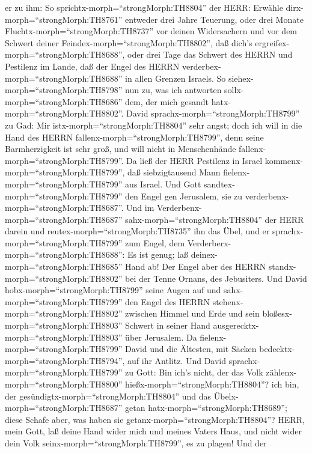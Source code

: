 er zu ihm: So sprichtx-morph=``strongMorph:TH8804'' der HERR: Erwähle
dirx-morph=``strongMorph:TH8761''  entweder drei Jahre
Teuerung, oder drei Monate Fluchtx-morph=``strongMorph:TH8737'' vor
deinen Widersachern und vor dem Schwert deiner
Feindex-morph=``strongMorph:TH8802'', daß dich's
ergreifex-morph=``strongMorph:TH8688'', oder drei Tage das Schwert des
HERRN und Pestilenz im Lande, daß der Engel des HERRN
verderbex-morph=``strongMorph:TH8688'' in allen Grenzen Israels. So
siehex-morph=``strongMorph:TH8798'' nun zu, was ich antworten
sollx-morph=``strongMorph:TH8686'' dem, der mich gesandt
hatx-morph=``strongMorph:TH8802''.  David
sprachx-morph=``strongMorph:TH8799'' zu Gad: Mir
istx-morph=``strongMorph:TH8804'' sehr angst; doch ich will in die Hand
des HERRN fallenx-morph=``strongMorph:TH8799'', denn seine
Barmherzigkeit ist sehr groß, und will nicht in Menschenhände
fallenx-morph=``strongMorph:TH8799''.  Da ließ der HERR
Pestilenz in Israel kommenx-morph=``strongMorph:TH8799'', daß
siebzigtausend Mann fielenx-morph=``strongMorph:TH8799'' aus Israel.
 Und Gott sandtex-morph=``strongMorph:TH8799'' den Engel
gen Jerusalem, sie zu verderbenx-morph=``strongMorph:TH8687''. Und im
Verderbenx-morph=``strongMorph:TH8687''
sahx-morph=``strongMorph:TH8804'' der HERR darein und
reutex-morph=``strongMorph:TH8735'' ihn das Übel, und er
sprachx-morph=``strongMorph:TH8799'' zum Engel, dem
Verderberx-morph=``strongMorph:TH8688'': Es ist genug; laß
deinex-morph=``strongMorph:TH8685'' Hand ab! Der Engel aber des HERRN
standx-morph=``strongMorph:TH8802'' bei der Tenne Ornans, des
Jebusiters.  Und David hobx-morph=``strongMorph:TH8799''
seine Augen auf und sahx-morph=``strongMorph:TH8799'' den Engel des
HERRN stehenx-morph=``strongMorph:TH8802'' zwischen Himmel und Erde und
sein bloßesx-morph=``strongMorph:TH8803'' Schwert in seiner Hand
ausgerecktx-morph=``strongMorph:TH8803'' über Jerusalem. Da
fielenx-morph=``strongMorph:TH8799'' David und die Ältesten, mit Säcken
bedecktx-morph=``strongMorph:TH8794'', auf ihr Antlitz. 
Und David sprachx-morph=``strongMorph:TH8799'' zu Gott: Bin ich's nicht,
der das Volk zählenx-morph=``strongMorph:TH8800''
hießx-morph=``strongMorph:TH8804''? ich bin, der
gesündigtx-morph=``strongMorph:TH8804'' und das
Übelx-morph=``strongMorph:TH8687'' getan
hatx-morph=``strongMorph:TH8689''; diese Schafe aber, was haben sie
getanx-morph=``strongMorph:TH8804''? HERR, mein Gott, laß deine Hand
wider mich und meines Vaters Haus, und nicht wider dein Volk
seinx-morph=``strongMorph:TH8799'', es zu plagen!  Und der
